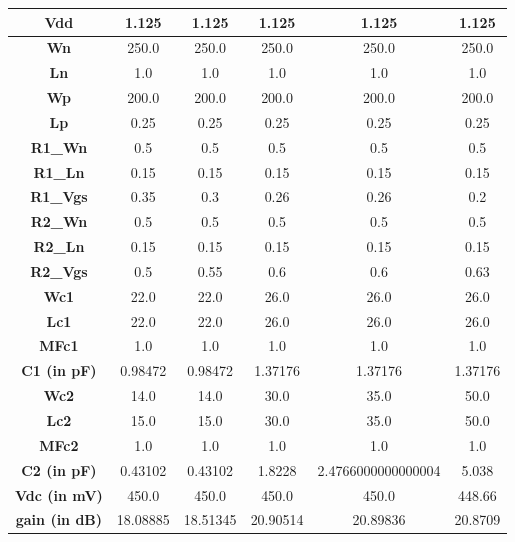 \begin{table}[!ht]
    \centering
    \begin{adjustbox}{max width=\linewidth}
    \begin{tabular}{|c|c|c|c|c|c|}
    \hline
        \textbf{Vdd} & 1.125 & 1.125 & 1.125 & 1.125 & 1.125 \\ \hline
        \textbf{Wn} & 250.0 & 250.0 & 250.0 & 250.0 & 250.0 \\ \hline
        \textbf{Ln} & 1.0 & 1.0 & 1.0 & 1.0 & 1.0 \\ \hline
        \textbf{Wp} & 200.0 & 200.0 & 200.0 & 200.0 & 200.0 \\ \hline
        \textbf{Lp} & 0.25 & 0.25 & 0.25 & 0.25 & 0.25 \\ \hline
        \textbf{R1\_Wn} & 0.5 & 0.5 & 0.5 & 0.5 & 0.5 \\ \hline
        \textbf{R1\_Ln} & 0.15 & 0.15 & 0.15 & 0.15 & 0.15 \\ \hline
        \textbf{R1\_Vgs} & 0.35 & 0.3 & 0.26 & 0.26 & 0.2 \\ \hline
        \textbf{R2\_Wn} & 0.5 & 0.5 & 0.5 & 0.5 & 0.5 \\ \hline
        \textbf{R2\_Ln} & 0.15 & 0.15 & 0.15 & 0.15 & 0.15 \\ \hline
        \textbf{R2\_Vgs} & 0.5 & 0.55 & 0.6 & 0.6 & 0.63 \\ \hline
        \textbf{Wc1} & 22.0 & 22.0 & 26.0 & 26.0 & 26.0 \\ \hline
        \textbf{Lc1} & 22.0 & 22.0 & 26.0 & 26.0 & 26.0 \\ \hline
        \textbf{MFc1} & 1.0 & 1.0 & 1.0 & 1.0 & 1.0 \\ \hline
        \textbf{C1 (in pF)} & 0.98472 & 0.98472 & 1.37176 & 1.37176 & 1.37176 \\ \hline
        \textbf{Wc2} & 14.0 & 14.0 & 30.0 & 35.0 & 50.0 \\ \hline
        \textbf{Lc2} & 15.0 & 15.0 & 30.0 & 35.0 & 50.0 \\ \hline
        \textbf{MFc2} & 1.0 & 1.0 & 1.0 & 1.0 & 1.0 \\ \hline
        \textbf{C2 (in pF)} & 0.43102 & 0.43102 & 1.8228 & 2.4766000000000004 & 5.038 \\ \hline
        \textbf{Vdc (in mV)} & 450.0 & 450.0 & 450.0 & 450.0 & 448.66 \\ \hline
        \textbf{gain (in dB)} & 18.08885 & 18.51345 & 20.90514 & 20.89836 & 20.8709 \\ \hline

\end{tabular}
\end{adjustbox}
\end{table}
